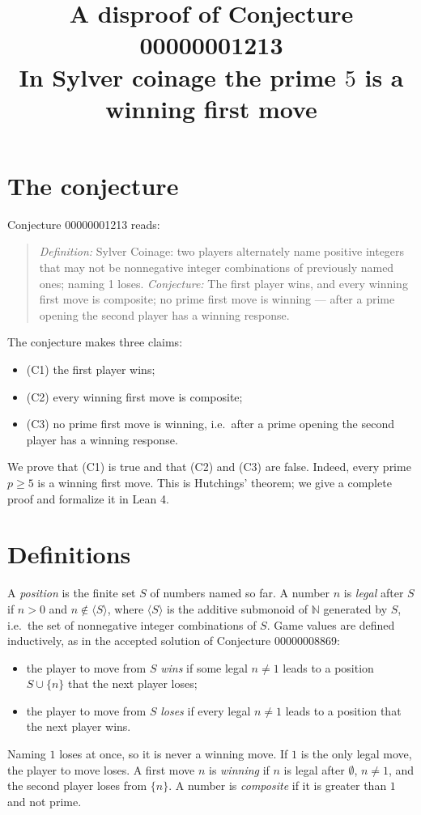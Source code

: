 \documentclass[11pt]{article}
\title{A disproof of Conjecture 00000001213\\[2pt]
\large In Sylver coinage the prime $5$ is a winning first move}
\date{}
\theoremstyle{definition}
\theoremstyle{remark}
\renewcommand{\_}{\oldus\allowbreak}
\begin{document}
\sloppy
\maketitle

\section{The conjecture}

Conjecture 00000001213 reads:

\begin{quote}
\emph{Definition:} Sylver Coinage: two players alternately name positive integers that may not be
nonnegative integer combinations of previously named ones; naming 1 loses. \emph{Conjecture:} The
first player wins, and every winning first move is composite; no prime first move is winning ---
after a prime opening the second player has a winning response.
\end{quote}

The conjecture makes three claims:
\begin{itemize}[nosep]
\item (C1) the first player wins;
\item (C2) every winning first move is composite;
\item (C3) no prime first move is winning, i.e.\ after a prime opening the second player has a winning
response.
\end{itemize}
We prove that (C1) is true and that (C2) and (C3) are false. Indeed, every prime $p \ge 5$ is a winning
first move. This is Hutchings' theorem; we give a complete proof and formalize it in Lean 4.

\section{Definitions}

A \emph{position} is the finite set $S$ of numbers named so far. A number $n$ is \emph{legal} after $S$
if $n > 0$ and $n \notin \langle S \rangle$, where $\langle S\rangle$ is the additive submonoid of
$\mathbb{N}$ generated by $S$, i.e.\ the set of nonnegative integer combinations of $S$. Game values are
defined inductively, as in the accepted solution of Conjecture 00000008869:
\begin{itemize}[nosep]
\item the player to move from $S$ \emph{wins} if some legal $n \ne 1$ leads to a position
$S \cup \{n\}$ that the next player loses;
\item the player to move from $S$ \emph{loses} if every legal $n \ne 1$ leads to a position that the
next player wins.
\end{itemize}
Naming $1$ loses at once, so it is never a winning move. If $1$ is the only legal move, the player to
move loses. A first move $n$ is \emph{winning} if $n$ is legal after $\emptyset$, $n \ne 1$, and the
second player loses from $\{n\}$. A number is \emph{composite} if it is greater than $1$ and not prime.
\end{document}
